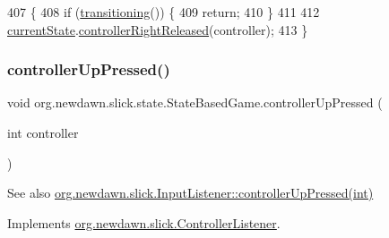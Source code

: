 \begin{DoxyCode}
407                                                         \{
408         \textcolor{keywordflow}{if} (\mbox{\hyperlink{classorg_1_1newdawn_1_1slick_1_1state_1_1_state_based_game_ae869c08778875776081935a090d4c92f}{transitioning}}()) \{
409             \textcolor{keywordflow}{return};
410         \}
411         
412         \mbox{\hyperlink{classorg_1_1newdawn_1_1slick_1_1state_1_1_state_based_game_a6a45e68094bb9b7ec30b8a8b7d415766}{currentState}}.\mbox{\hyperlink{interfaceorg_1_1newdawn_1_1slick_1_1_controller_listener_a33ee418e010e69783169b3f52fb62c3b}{controllerRightReleased}}(controller);
413     \}
\end{DoxyCode}
\mbox{\label{classorg_1_1newdawn_1_1slick_1_1state_1_1_state_based_game_aca15c428e95858fe7d3061948f581e22}} 
\subsubsection{\texorpdfstring{controller\+Up\+Pressed()}{controllerUpPressed()}}
{\footnotesize\ttfamily void org.\+newdawn.\+slick.\+state.\+State\+Based\+Game.\+controller\+Up\+Pressed (\begin{DoxyParamCaption}\item[{int}]{controller }\end{DoxyParamCaption})\hspace{0.3cm}{\ttfamily [inline]}}

\begin{DoxySeeAlso}{See also}
\mbox{\hyperlink{interfaceorg_1_1newdawn_1_1slick_1_1_controller_listener_a7cb917761de1e555b23469042b6f1e03}{org.\+newdawn.\+slick.\+Input\+Listener\+::controller\+Up\+Pressed(int)}} 
\end{DoxySeeAlso}


Implements \mbox{\hyperlink{interfaceorg_1_1newdawn_1_1slick_1_1_controller_listener_a7cb917761de1e555b23469042b6f1e03}{org.\+newdawn.\+slick.\+Controller\+Listener}}.


